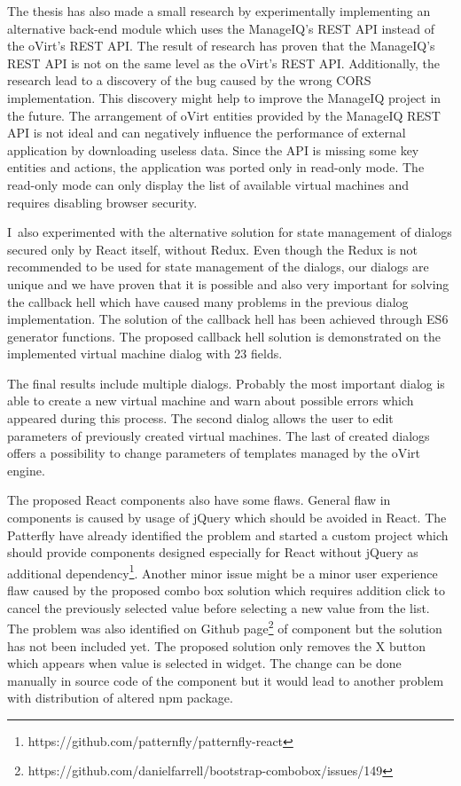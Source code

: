 The thesis has also made a small research by experimentally implementing an alternative back-end module which uses the ManageIQ's REST API instead of the oVirt's REST API. The result of research has proven that the ManageIQ's REST API is not on the same level as the oVirt's REST API. Additionally, the research lead to a discovery of the bug caused by the wrong CORS implementation. This discovery might help to improve the ManageIQ project in the future. The arrangement of oVirt entities provided by the ManageIQ REST API is not ideal and can negatively influence the performance of external application by downloading useless data. Since the API is missing some key entities and actions, the application was ported only in read-only mode. The read-only mode can only display the list of available virtual machines and requires disabling browser security.

I~also experimented with the alternative solution for state management of dialogs secured only by React itself, without Redux. Even though the Redux is not recommended to be used for state management of the dialogs, our dialogs are unique and we have proven that it is possible and also very important for solving the callback hell which have caused many problems in the previous dialog implementation. The solution of the callback hell has been achieved through ES6 generator functions. The proposed callback hell solution is demonstrated on the implemented virtual machine dialog with 23 fields.

The final results include multiple dialogs. Probably the most important dialog is able to create a new virtual machine and warn about possible errors which appeared during this process. The second dialog allows the user to edit parameters of previously created virtual machines. The last of created dialogs offers a possibility to change parameters of templates managed by the oVirt engine.

The proposed React components also have some flaws. General flaw in components is caused by usage of jQuery which should be avoided in React. The Patterfly have already identified the problem and started a custom project which should provide components designed especially for React without jQuery as additional dependency\footnote{https://github.com/patternfly/patternfly-react}. Another minor issue might be a minor user experience flaw caused by the proposed combo box solution which requires addition click to cancel the previously selected value before selecting a new value from the list. The problem was also identified on Github page\footnote{https://github.com/danielfarrell/bootstrap-combobox/issues/149 } of component but the solution has not been included yet. The proposed solution only removes the X button which appears when value is selected in widget. The change can be done manually in source code of the component but it would lead to another problem with distribution of altered npm package.

